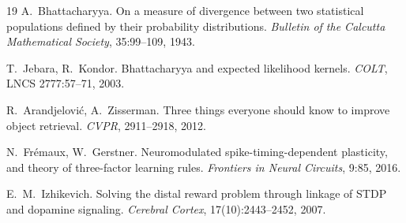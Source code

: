 \documentclass[11pt]{article}
\begin{document}
\begin{thebibliography}{19}
 A.~Bhattacharyya.
On a measure of divergence between two statistical populations defined by their probability distributions. \emph{Bulletin of the Calcutta Mathematical Society}, 35:99--109, 1943.

 T.~Jebara, R.~Kondor.
Bhattacharyya and expected likelihood kernels. \emph{COLT}, LNCS 2777:57--71, 2003.

 R.~Arandjelovi\'c, A.~Zisserman.
Three things everyone should know to improve object retrieval. \emph{CVPR}, 2911--2918, 2012.

 N.~Fr\'emaux, W.~Gerstner.
Neuromodulated spike-timing-dependent plasticity, and theory of three-factor learning rules. \emph{Frontiers in Neural Circuits}, 9:85, 2016.

 E.~M.~Izhikevich.
Solving the distal reward problem through linkage of STDP and dopamine signaling. \emph{Cerebral Cortex}, 17(10):2443--2452, 2007.

\end{thebibliography}
\end{document}
